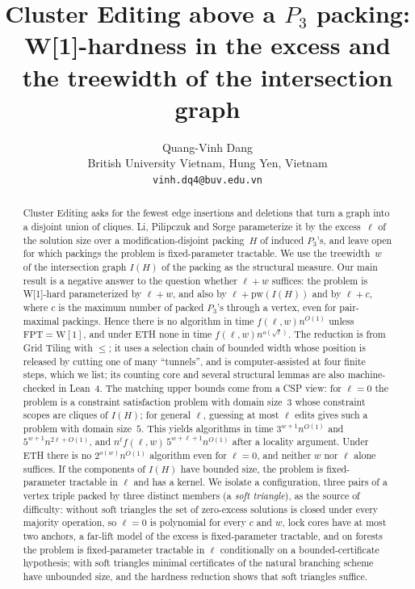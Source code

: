 \documentclass[11pt]{article}
\title{Cluster Editing above a $P_3$ packing:\\ W[1]-hardness in the excess and the treewidth of the intersection graph}
\author{Quang-Vinh Dang\\ British University Vietnam, Hung Yen, Vietnam\\ \texttt{vinh.dq4@buv.edu.vn}}
\date{}
\theoremstyle{definition}
\theoremstyle{remark}
\begin{document}
\maketitle
\begin{abstract}
Cluster Editing asks for the fewest edge insertions and deletions that turn a graph into a disjoint union of cliques.
Li, Pilipczuk and Sorge parameterize it by the excess~$\ell$ of the solution size over a modification-disjoint packing~$H$ of induced $P_3$'s, and leave open for which packings the problem is fixed-parameter tractable.
We use the treewidth~$w$ of the intersection graph $I(H)$ of the packing as the structural measure.
Our main result is a negative answer to the question whether $\ell+w$ suffices: the problem is W[1]-hard parameterized by $\ell+w$, and also by $\ell+\mathrm{pw}(I(H))$ and by $\ell+c$, where $c$ is the maximum number of packed $P_3$'s through a vertex, even for pair-maximal packings. Hence there is no algorithm in time $f(\ell,w)n^{O(1)}$ unless $\mathrm{FPT}=\mathrm{W[1]}$, and under ETH none in time $f(\ell,w)n^{o(\sqrt\ell)}$.
The reduction is from Grid Tiling with $\le$; it uses a selection chain of bounded width whose position is released by cutting one of many ``tunnels'', and is computer-assisted at four finite steps, which we list; its counting core and several structural lemmas are also machine-checked in Lean~4.
The matching upper bounds come from a CSP view: for $\ell=0$ the problem is a constraint satisfaction problem with domain size~$3$ whose constraint scopes are cliques of $I(H)$; for general $\ell$, guessing at most $\ell$ edits gives such a problem with domain size~$5$.
This yields algorithms in time $3^{w+1}n^{O(1)}$ and $5^{w+1}n^{2\ell+O(1)}$, and $n^{\ell}f(\ell,w)\,5^{w+\ell+1}n^{O(1)}$ after a locality argument.
Under ETH there is no $2^{o(w)}n^{O(1)}$ algorithm even for $\ell=0$, and neither $w$ nor $\ell$ alone suffices.
If the components of $I(H)$ have bounded size, the problem is fixed-parameter tractable in $\ell$ and has a kernel.
We isolate a configuration, three pairs of a vertex triple packed by three distinct members (a \emph{soft triangle}), as the source of difficulty: without soft triangles the set of zero-excess solutions is closed under every majority operation, so $\ell=0$ is polynomial for every $c$ and $w$, lock cores have at most two anchors, a far-lift model of the excess is fixed-parameter tractable, and on forests the problem is fixed-parameter tractable in $\ell$ conditionally on a bounded-certificate hypothesis; with soft triangles minimal certificates of the natural branching scheme have unbounded size, and the hardness reduction shows that soft triangles suffice.

\end{abstract}
\end{document}
